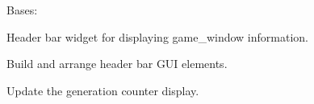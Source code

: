 \documentclass[letterpaper,10pt,oneside,english]{sphinxhowto}
\begin{document}
\begin{fulllineitems}
\label{\detokenize{gui:gui.game_modules.header_bar.HeaderBar}}
\pysigstartsignatures
\pysiglinewithargsret
{}
{}
{}
\pysigstopsignatures
\sphinxAtStartPar
Bases: 

\sphinxAtStartPar
Header bar widget for displaying game\_window information.

\begin{fulllineitems}
\label{\detokenize{gui:gui.game_modules.header_bar.HeaderBar.build_ui}}
\pysigstartsignatures
\pysiglinewithargsret
{}
{}
{}
\pysigstopsignatures
\sphinxAtStartPar
Build and arrange header bar GUI elements.

\end{fulllineitems}


\begin{fulllineitems}
\label{\detokenize{gui:gui.game_modules.header_bar.HeaderBar.set_generation}}
\pysigstartsignatures
\pysiglinewithargsret
{}
{}
{}
\pysigstopsignatures
\sphinxAtStartPar
Update the generation counter display.

\end{fulllineitems}


\end{fulllineitems}
\end{document}
